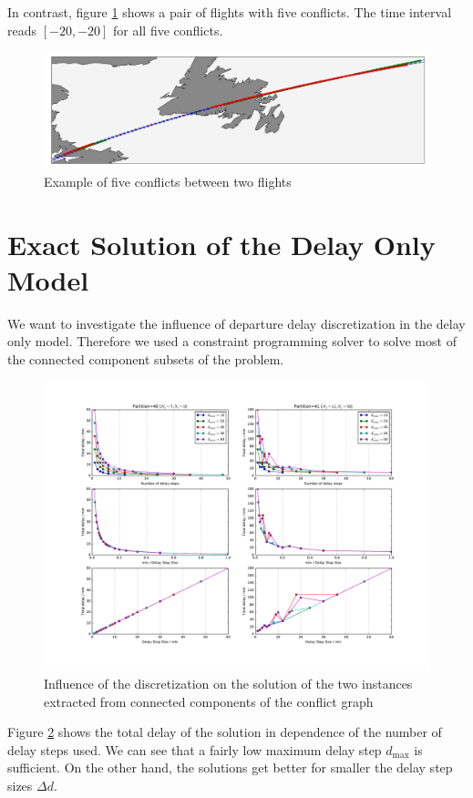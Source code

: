 \documentclass{article}
\begin{document}
In contrast, figure \ref{fig:pre_flight_pair_with_five_conflicts} shows a pair of flights with five conflicts.
The time interval reads $[-20, -20]$ for all five conflicts.
\begin{figure}[htpb]
    \centering
    \includegraphics[width=1.0\linewidth]{pics/pre_flight_pair_with_five_conflicts.pdf}
    \caption{Example of five conflicts between two flights}
    \label{fig:pre_flight_pair_with_five_conflicts}
\end{figure}


\newpage
\section{Exact Solution of the Delay Only Model}
We want to investigate the influence of departure delay discretization in the delay only model.
Therefore we used a constraint programming solver to solve most of the connected component subsets of the problem.
\begin{figure}[htpb]
    \centering
    \includegraphics[width=1.0\linewidth]{pics/totalDelayVsDelayStep_examples.pdf}
    \caption{Influence of the discretization on the solution of the two instances extracted from connected components of the conflict graph}
    \label{fig:totalDelayVsDelayStep}
\end{figure}
Figure \ref{fig:totalDelayVsDelayStep} shows the total delay of the solution in dependence of the number of delay steps used.
We can see that a fairly low maximum delay step $d_\text{max}$ is sufficient.
On the other hand, the solutions get better for smaller the delay step sizes $\Delta d$.
\end{document}
